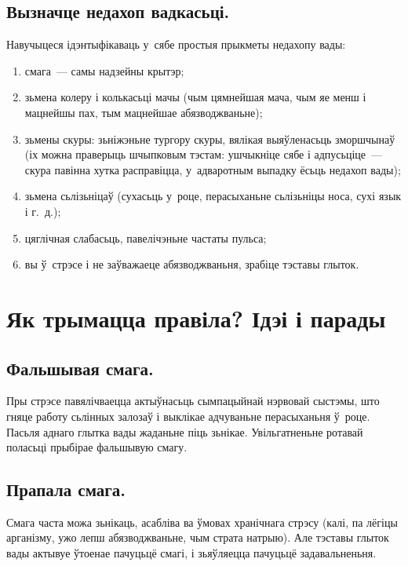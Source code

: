 \subsection{Вызначце недахоп вадкасьці.} Навучыцеся ідэнтыфікаваць у~сябе простыя прыкметы недахопу вады:
\begin{enumerate}[itemindent=3em,labelwidth=1.5em,leftmargin=0pt,nosep]
  \item смага~--- самы надзейны крытэр;
  \item зьмена колеру і колькасьці мачы (чым цямнейшая мача, чым яе менш і мацнейшы пах, тым мацнейшае абязводжваньне);
  \item зьмены скуры: зьніжэньне тургору скуры, вялікая выяўленасьць зморшчынаў (іх можна праверыць шчыпковым тэстам: ушчыкніце сябе і адпусьціце~--- скура павінна хутка расправіцца, у~адваротным выпадку ёсьць недахоп вады);
  \item зьмена сьлізьніцаў (сухасьць у~роце, перасыханьне сьлізьніцы носа, сухі язык і г.~д.);
  \item цяглічная слабасьць, павелічэньне частаты пульса;
  \item вы ў~стрэсе і не заўважаеце абязводжваньня, зрабіце тэставы глыток.
\end{enumerate}

\section{Як трымацца правіла? Ідэі і парады}

\subsection{Фальшывая смага.}
Пры стрэсе павялічваецца актыўнасьць сымпацыйнай нэрвовай сыстэмы, што гняце работу сьлінных залозаў і выклікае адчуваньне перасыханьня ў~роце. Пасьля аднаго глытка вады жаданьне піць зьнікае. Увільгатненьне ротавай поласьці прыбірае фальшывую смагу.


\subsection{Прапала смага.}
Смага часта можа зьнікаць, асабліва ва ўмовах хранічнага стрэсу (калі, па лёгіцы арганізму, ужо лепш абязводжваньне, чым страта натрыю). Але тэставы глыток вады актывуе ўтоенае пачуцьцё смагі, і зьяўляецца пачуцьцё задавальненьня.

